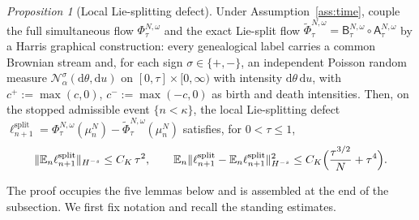 \documentclass[a4paper,fleqn]{cas-sc}
\theoremstyle{definition}
\theoremstyle{remark}
\newtheorem{proposition}{Proposition}
\begin{document}
\begin{proposition}[Local Lie-splitting defect]\label{prop:local-split-defect}\label{lem:split}
Under Assumption~\ref{ass:time}, couple the full simultaneous flow
$\Phi^{N,\omega}_\tau$ and the exact Lie-split flow
$\widetilde\Phi^{N,\omega}_\tau=\mathsf B^{N,\omega}_\tau\circ\mathsf A^{N,\omega}_\tau$
by a Harris graphical construction: every genealogical label carries a common
Brownian stream and, for each sign $\sigma\in\{+,-\}$, an independent Poisson random
measure $\mathcal N^{\sigma}_\alpha(\mathrm d\theta,\mathrm du)$ on
$[0,\tau]\times[0,\infty)$ with intensity $\mathrm d\theta\,\mathrm du$, with
$c^+:=\max(c,0)$, $c^-:=\max(-c,0)$ as birth and death intensities. Then, on the
stopped admissible event $\{n<\kappa\}$, the local Lie-splitting
defect $\ell^{\mathrm{split}}_{n+1}
=\Phi^{N,\omega}_\tau(\mu^N_n)-\widetilde\Phi^{N,\omega}_\tau(\mu^N_n)$ satisfies, for
$0<\tau\le1$,
\begin{equation}\label{eq:split}
\|\mathbb E_n\ell^{\mathrm{split}}_{n+1}\|_{H^{-s}}\le C_K\,\tau^2,
\qquad
\mathbb E_n\|\ell^{\mathrm{split}}_{n+1}-\mathbb E_n\ell^{\mathrm{split}}_{n+1}\|_{H^{-s}}^2
\le C_K\Bigl(\frac{\tau^{3/2}}{N}+\tau^4\Bigr).
\end{equation}
\end{proposition}

The proof occupies the five lemmas below and is assembled at the end of the
subsection. We first fix notation and recall the standing estimates.
\end{document}

